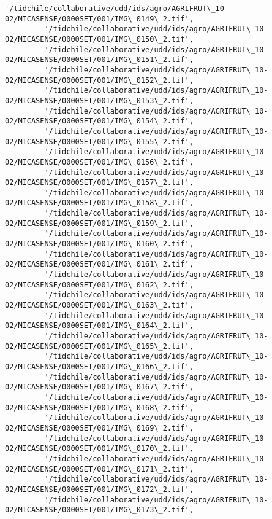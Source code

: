 \documentclass[11pt]{article}
\begin{document}
\begin{Verbatim}[commandchars=\\\{\}]
         '/tidchile/collaborative/udd/ids/agro/AGRIFRUT\_10-02/MICASENSE/0000SET/001/IMG\_0149\_2.tif',
         '/tidchile/collaborative/udd/ids/agro/AGRIFRUT\_10-02/MICASENSE/0000SET/001/IMG\_0150\_2.tif',
         '/tidchile/collaborative/udd/ids/agro/AGRIFRUT\_10-02/MICASENSE/0000SET/001/IMG\_0151\_2.tif',
         '/tidchile/collaborative/udd/ids/agro/AGRIFRUT\_10-02/MICASENSE/0000SET/001/IMG\_0152\_2.tif',
         '/tidchile/collaborative/udd/ids/agro/AGRIFRUT\_10-02/MICASENSE/0000SET/001/IMG\_0153\_2.tif',
         '/tidchile/collaborative/udd/ids/agro/AGRIFRUT\_10-02/MICASENSE/0000SET/001/IMG\_0154\_2.tif',
         '/tidchile/collaborative/udd/ids/agro/AGRIFRUT\_10-02/MICASENSE/0000SET/001/IMG\_0155\_2.tif',
         '/tidchile/collaborative/udd/ids/agro/AGRIFRUT\_10-02/MICASENSE/0000SET/001/IMG\_0156\_2.tif',
         '/tidchile/collaborative/udd/ids/agro/AGRIFRUT\_10-02/MICASENSE/0000SET/001/IMG\_0157\_2.tif',
         '/tidchile/collaborative/udd/ids/agro/AGRIFRUT\_10-02/MICASENSE/0000SET/001/IMG\_0158\_2.tif',
         '/tidchile/collaborative/udd/ids/agro/AGRIFRUT\_10-02/MICASENSE/0000SET/001/IMG\_0159\_2.tif',
         '/tidchile/collaborative/udd/ids/agro/AGRIFRUT\_10-02/MICASENSE/0000SET/001/IMG\_0160\_2.tif',
         '/tidchile/collaborative/udd/ids/agro/AGRIFRUT\_10-02/MICASENSE/0000SET/001/IMG\_0161\_2.tif',
         '/tidchile/collaborative/udd/ids/agro/AGRIFRUT\_10-02/MICASENSE/0000SET/001/IMG\_0162\_2.tif',
         '/tidchile/collaborative/udd/ids/agro/AGRIFRUT\_10-02/MICASENSE/0000SET/001/IMG\_0163\_2.tif',
         '/tidchile/collaborative/udd/ids/agro/AGRIFRUT\_10-02/MICASENSE/0000SET/001/IMG\_0164\_2.tif',
         '/tidchile/collaborative/udd/ids/agro/AGRIFRUT\_10-02/MICASENSE/0000SET/001/IMG\_0165\_2.tif',
         '/tidchile/collaborative/udd/ids/agro/AGRIFRUT\_10-02/MICASENSE/0000SET/001/IMG\_0166\_2.tif',
         '/tidchile/collaborative/udd/ids/agro/AGRIFRUT\_10-02/MICASENSE/0000SET/001/IMG\_0167\_2.tif',
         '/tidchile/collaborative/udd/ids/agro/AGRIFRUT\_10-02/MICASENSE/0000SET/001/IMG\_0168\_2.tif',
         '/tidchile/collaborative/udd/ids/agro/AGRIFRUT\_10-02/MICASENSE/0000SET/001/IMG\_0169\_2.tif',
         '/tidchile/collaborative/udd/ids/agro/AGRIFRUT\_10-02/MICASENSE/0000SET/001/IMG\_0170\_2.tif',
         '/tidchile/collaborative/udd/ids/agro/AGRIFRUT\_10-02/MICASENSE/0000SET/001/IMG\_0171\_2.tif',
         '/tidchile/collaborative/udd/ids/agro/AGRIFRUT\_10-02/MICASENSE/0000SET/001/IMG\_0172\_2.tif',
         '/tidchile/collaborative/udd/ids/agro/AGRIFRUT\_10-02/MICASENSE/0000SET/001/IMG\_0173\_2.tif',

\end{Verbatim}
\end{document}
